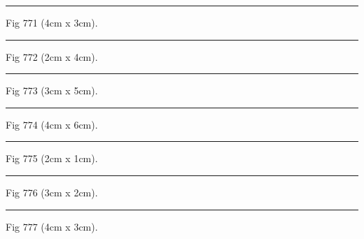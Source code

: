 \documentclass[a4paper,11pt]{article}
\begin{document}
\begin{swarmwrap}%
  \begin{minipage}[t]{4cm}
    \centering
    \rule{\linewidth}{3cm}
    {\footnotesize Fig 771 (4cm x 3cm).}
  \end{minipage}%
\end{swarmwrap}%
\swarmwrapnext
\lipsum[21]%

\begin{swarmwrap}%
  \begin{minipage}[t]{2cm}
    \centering
    \rule{\linewidth}{4cm}
    {\footnotesize Fig 772 (2cm x 4cm).}
  \end{minipage}%
\end{swarmwrap}%
\swarmwrapnext
\lipsum[22]%

\begin{swarmwrap}%
  \begin{minipage}[t]{3cm}
    \centering
    \rule{\linewidth}{5cm}
    {\footnotesize Fig 773 (3cm x 5cm).}
  \end{minipage}%
\end{swarmwrap}%
\swarmwrapnext
\lipsum[23]%

\begin{swarmwrap}%
  \begin{minipage}[t]{4cm}
    \centering
    \rule{\linewidth}{6cm}
    {\footnotesize Fig 774 (4cm x 6cm).}
  \end{minipage}%
\end{swarmwrap}%
\swarmwrapnext
\lipsum[24]%

\begin{swarmwrap}%
  \begin{minipage}[t]{2cm}
    \centering
    \rule{\linewidth}{1cm}
    {\footnotesize Fig 775 (2cm x 1cm).}
  \end{minipage}%
\end{swarmwrap}%
\swarmwrapnext
\lipsum[25]%

\begin{swarmwrap}%
  \begin{minipage}[t]{3cm}
    \centering
    \rule{\linewidth}{2cm}
    {\footnotesize Fig 776 (3cm x 2cm).}
  \end{minipage}%
\end{swarmwrap}%
\swarmwrapnext
\lipsum[26]%

\begin{swarmwrap}%
  \begin{minipage}[t]{4cm}
    \centering
    \rule{\linewidth}{3cm}
    {\footnotesize Fig 777 (4cm x 3cm).}
  \end{minipage}%
\end{swarmwrap}%
\swarmwrapnext
\lipsum[27]%
\end{document}
